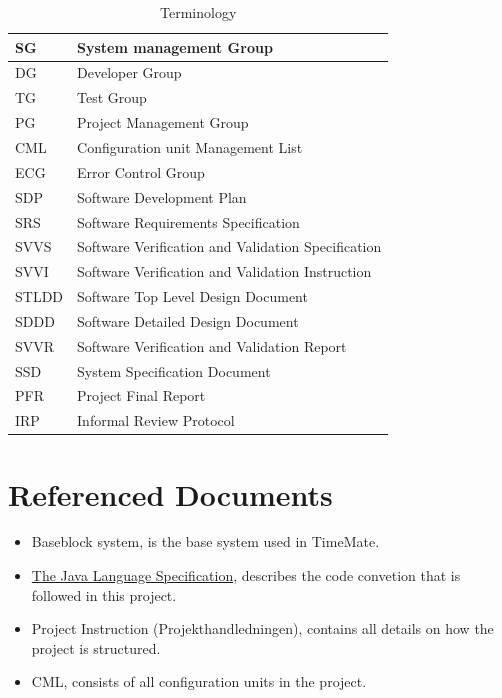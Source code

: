 \documentclass{article}
\begin{document}
    \begin{table}[h]
        \centering
        \begin{tabular}{| l | l |}
            \hline
                SG & System management Group \\
            \hline
                DG & Developer Group \\
            \hline
                TG & Test Group \\
            \hline
                PG & Project Management Group \\
            \hline 
                CML & Configuration unit Management List \\
            \hline            
                ECG & Error Control Group \\
            \hline
                SDP & Software Development Plan \\
            \hline
                SRS & Software Requirements Specification \\
            \hline
                SVVS & Software Verification and Validation Specification \\
            \hline
                SVVI & Software Verification and Validation Instruction \\
            \hline
                STLDD & Software Top Level Design Document \\
            \hline
                SDDD & Software Detailed Design Document \\
            \hline
                SVVR & Software Verification and Validation Report \\
            \hline
                SSD & System Specification Document \\
            \hline
                PFR & Project Final Report \\
            \hline
                IRP & Informal Review Protocol \\
            \hline
        \end{tabular}
        \caption{Terminology}
        \label{Terminology}
    \end{table}

\section{Referenced Documents}
    \begin{itemize}
        \item Baseblock system, is the base system used in TimeMate.
        \item \href{https://docs.oracle.com/javase/specs/jls/se11/html/index.html}{The Java Language Specification}, describes the code convetion that is followed in this project.
        \item \label{PH} Project Instruction (Projekthandledningen), contains all details on how the project is structured.
        \item CML, consists of all configuration units in the project.
    \end{itemize}
    
\end{document}
